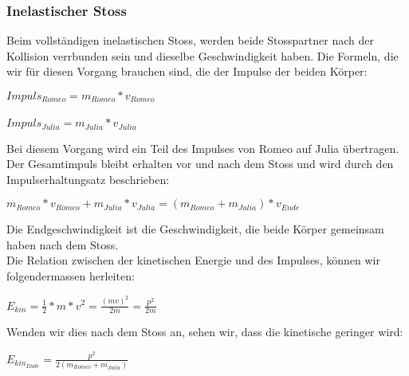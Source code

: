 \documentclass[../main.tex]{subfiles}
\begin{document}
\subsubsection{Inelastischer Stoss}
Beim vollständigen inelastischen Stoss, werden beide Stosspartner nach der Kollision verrbunden sein und dieselbe Geschwindigkeit haben\cite{tiplerpaula.PhysikFurStudierende}. Die Formeln, die wir für diesen Vorgang brauchen sind, die der Impulse der beiden Körper:
\begin{mdframed}
$Impuls_{Romeo} = m_{Romeo}*v_{Romeo}$\\\\
$Impuls_{Julia} = m_{Julia}*v_{Julia}$
\end{mdframed}
 Bei diesem Vorgang wird ein Teil des Impulses von Romeo auf Julia übertragen. Der Gesamtimpuls bleibt erhalten vor und nach dem Stoss und wird durch den Impulserhaltungsatz beschrieben\cite{tiplerpaula.PhysikFurStudierende}:
\begin{mdframed}
$ m_{Romeo}*v_{Romeo} +  m_{Julia}*v_{Julia} = (m_{Romeo} + m_{Julia})*v_{Ende}$
\end{mdframed}
Die Endgeschwindigkeit ist die Geschwindigkeit, die beide Körper gemeinsam haben nach dem Stoss.\\
Die Relation zwischen der kinetischen Energie und des Impulses, können wir folgendermassen herleiten\cite{tiplerpaula.PhysikFurStudierende}:
\begin{mdframed}
$E_{kin}=\frac{1}{2} * m * v^{2} = \frac{(mv)^{2}}{2m} = \frac{p^{2}}{2m}$
\end{mdframed}
Wenden wir dies nach dem Stoss an, sehen wir, dass die kinetische geringer wird:
\begin{mdframed}
$E_{kin_{Ende}}=\frac{p^{2}}{2(m_{Romeo} + m_{Julia})} $
\end{mdframed}
\end{document}
